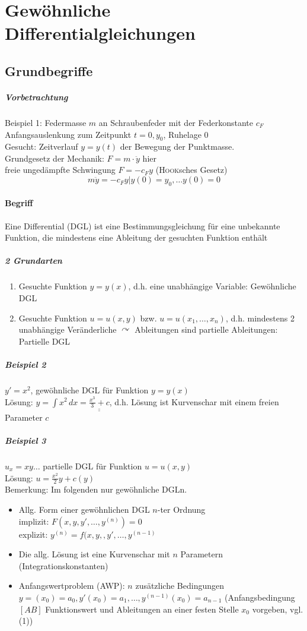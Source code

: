 \documentclass[a4paper]{scrartcl}
\begin{document}
\section{Gewöhnliche Differentialgleichungen}
\subsection{Grundbegriffe}
\subparagraph{Vorbetrachtung}
Beispiel 1: Federmasse $m$ an Schraubenfeder mit der Federkonstante $c_F$ Anfangsauslenkung zum Zeitpunkt $t=0, y_0$, Ruhelage $0$\\
Gesucht: Zeitverlauf $y=y(t)$ der Bewegung der Punktmasse.\\
Grundgesetz der Mechanik: $F = m \cdot \ddot{y}$ hier\\
freie ungedämpfte Schwingung $F = - c_F y$ (\textsc{Hook}sches Gesetz)
\begin{equation}\label{71.1}
m \ddot{y} = - c_F y | y(0) = y_0, \dots{y}(0) = 0
\end{equation}
\paragraph{Begriff} Eine Differential (DGL) ist eine Bestimmungsgleichung für eine unbekannte Funktion, die mindestens eine Ableitung der gesuchten Funktion enthält
\subparagraph{2 Grundarten}
\begin{enumerate}
\item Gesuchte Funktion $y=y(x)$, d.h. eine unabhängige Variable: Gewöhnliche DGL
\item Gesuchte Funktion $u=u(x,y)$ bzw. $u=u(x_1,\dots,x_n)$, d.h. mindestens 2 unabhängige Veränderliche $\curvearrowright$ Ableitungen sind partielle Ableitungen: Partielle DGL
\end{enumerate}

\subparagraph{Beispiel 2} $y' = x^2$, gewöhnliche DGL für Funktion $y=y(x)$\\
Lösung: $y= \int x^2 \, dx = \underline{\underline{\frac{x^3}{3} + c}}$, d.h. Lösung ist Kurvenschar mit einem freien Parameter $c$

\subparagraph{Beispiel 3} $u_x = xy \dots $ partielle DGL für Funktion $u=u(x,y)$\\
Lösung: $u=\frac{x^2}{2} y + c(y)$\\
Bemerkung: Im folgenden nur gewöhnliche DGLn.

\begin{itemize}
\item Allg. Form einer gewöhnlichen DGL $n$-ter Ordnung\\
implizit: $F(x,y,y',\dots,y^{(n)}) = 0$\\
explizit: $y^{(n)} = f(x,y,,y',\dots,y^{(n-1)}$
\item Die allg. Lösung ist eine Kurvenschar mit $n$ Parametern (Integrationskonstanten)
\item Anfangswertproblem (AWP): $n$ zusätzliche Bedingungen $y=(x_0) = a_0,y'(x_0) = a_1,\dots,y^{(n-1)} (x_0) = a_{n-1}$ (Anfangsbedingung $[AB]$ Funktionswert und Ableitungen an einer festen Stelle $x_0$ vorgeben, vgl. (1))
\end{itemize}
\end{document}
